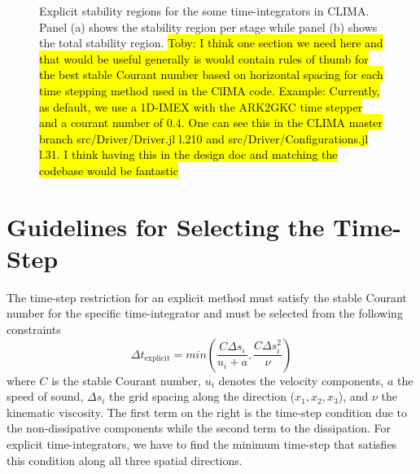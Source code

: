\documentclass{report}
\newcommand{\hlc}[2][yellow]{ {\sethlcolor{#1} \hl{#2}} }
\numberwithin{equation}{section}
\begin{document}
\begin{figure}[htbp]
\begin{center}
\end{center}
\caption{Explicit stability regions for the some time-integrators in CLIMA. Panel (a) shows the stability region per stage while panel (b) shows the total stability region.
\hlc[green]{Toby: I think one section we need here and that would be useful generally is would contain rules of thumb for the best stable Courant number based on horizontal spacing for each time stepping method used in the ClIMA code. Example: Currently, as default, we use a 1D-IMEX with the ARK2GKC time stepper and a courant number of 0.4. One can see this in the CLIMA master branch src/Driver/Driver.jl l.210 and src/Driver/Configurations.jl l.31. I think having this in the design doc and matching the codebase would be fantastic}
}
\label{fig:time_integration/explicit_stability}
\end{figure}

\section{Guidelines for Selecting the Time-Step}
The time-step restriction for an explicit method must satisfy the stable Courant number for the specific time-integrator and must be selected from the following constraints
\[
\Delta t_{\mathrm{explicit}} = min \left( \frac{C \Delta s_i}{u_i + a}, \frac{C \Delta s_i^2}{\nu} \right)
\]
where $C$ is the stable Courant number, $u_i$ denotes the velocity components, $a$ the speed of sound, $\Delta s_i$ the grid spacing along the direction ($x_1,x_2,x_3$), and $\nu$ the kinematic viscosity. The first term on the right is the time-step condition due to the non-dissipative components while the second term to the dissipation. For explicit time-integrators, we have to find the minimum time-step that satisfies this condition along all three spatial directions.
\end{document}
